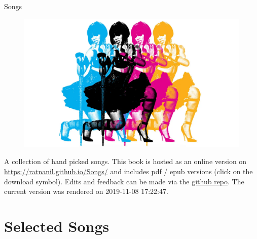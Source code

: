 \documentclass[]{book}
\title{}
\author{}
\date{}
\begin{document}

\begin{titlepage}
\begin{center}
  

\end{center}
\vspace{1.5cm}
\begin{center}

{\LARGE Songs}

\end{center}
 \vspace{1cm}

\begin{figure}[htbp]
  \centering
  \includegraphics[width=1\textwidth]{misc/title.png}
  \label{titelbild}
\end{figure}

\begin{center}
\textbf{}


\end{center} 

\vspace{1.0cm}


\end{titlepage}

{
\setcounter{tocdepth}{1}
\tableofcontents
}
A collection of hand picked songs. This book is hosted as an online version on \url{https://ratnanil.github.io/Songs/} and includes pdf / epub versions (click on the download symbol). Edits and feedback can be made via the \href{https://github.com/ratnanil/songs}{github repo}. The current version was rendered on 2019-11-08 17:22:47.

\hypertarget{selected-songs}{%
\chapter{Selected Songs}\label{selected-songs}}
\end{document}
